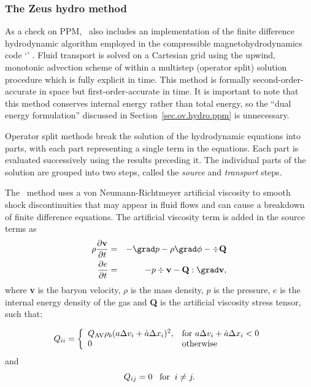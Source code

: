 \subsubsection{The Zeus hydro method}\label{sec.ov.hydro.zeus}


As a check on PPM, \enzo\ also includes an implementation of the
finite difference hydrodynamic algorithm employed in the compressible 
magnetohydrodynamics code `\zeus'
\citep{Stone92a, Stone92b}.  Fluid transport is solved on a Cartesian
grid using the upwind, monotonic advection scheme of \citet{1977JCoPh..23..276V} 
within a multistep 
(operator split) solution procedure which is fully explicit in time.  
This method is formally second-order-accurate in space but 
first-order-accurate in time.  It is important to note that 
this method conserves internal energy
rather than total energy, so the ``dual energy
formulation'' discussed in Section~\ref{sec.ov.hydro.ppm} is unnecessary.
 

Operator split methods break
the solution of the hydrodynamic equations into parts, with each part
representing a single term in the equations.  Each part is evaluated
successively using the results preceding it.  The individual parts of
the solution are grouped into two steps, called the \emph{source} and
\emph{transport} steps.

The \zeus\ method uses a von Neumann-Richtmeyer artificial viscosity 
to smooth shock discontinuities that may
appear in fluid flows and can cause a breakdown of finite difference
equations.  The artificial viscosity term is added in the source terms
as
\begin{eqnarray}
\rho \frac{\partial\textbf{v}}{\partial t} &=& - \grad p - \rho \grad \phi 
- \div \textbf{Q} \\
\frac{\partial e}{\partial t} &=& -p \div \textbf{v} - \textbf{Q} : \grad \textbf{v}, 
\end{eqnarray}
where \textbf{v} is the baryon velocity, $\rho$ is the mass density,
$p$ is the pressure, $e$ is the internal energy density of the gas and \textbf{Q}
is the artificial viscosity stress tensor, such that:

\begin{eqnarray}
Q_{ii} = \left\{ \begin{array}{ll}
Q_{\rm AV} \rho_b  (a \Delta v_{i} + \dot{a} \Delta x_i)^2, 
& \textrm{for $a \Delta v_{i} + \dot{a} \Delta x_i < 0$}  \\
0 & \textrm{otherwise}\\
\end{array} \right. 
\end{eqnarray}
and
\begin{equation}
Q_{ij} = 0  \;\;\;{\rm for}\;\; i \ne j .
\end{equation}

